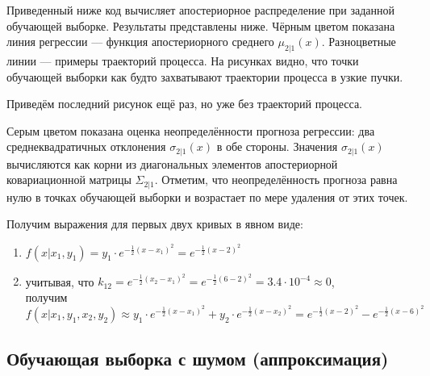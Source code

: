 \documentclass[11pt,a4paper]{article}
\providecommand{\tightlist}{%
      \setlength{\itemsep}{0pt}\setlength{\parskip}{0pt}}
\begin{document}
Приведенный ниже код вычисляет апостериорное распределение при заданной
обучающей выборке. Результаты представлены ниже. Чёрным цветом показана
линия регрессии --- функция апостериорного среднего \(\mu_{2|1}(x)\).
Разноцветные линии --- примеры траекторий процесса. На рисунках видно,
что точки обучающей выборки как будто захватывают траектории процесса в
узкие пучки.


    \begin{center}
    \end{center}
    
    Приведём последний рисунок ещё раз, но уже без траекторий процесса.

Серым цветом показана оценка неопределённости прогноза регрессии: два
среднеквадратичных отклонения \(\sigma_{2|1}(x)\) в обе стороны.
Значения \(\sigma_{2|1}(x)\) вычисляются как корни из диагональных
элементов апостериорной ковариационной матрицы \(\Sigma_{2|1}\).
Отметим, что неопределённость прогноза равна нулю в точках обучающей
выборки и возрастает по мере удаления от этих точек.


    \begin{center}
    \end{center}
    
    Получим выражения для первых двух кривых в явном виде:

\begin{enumerate}
\def\labelenumi{\arabic{enumi}.}
\tightlist
\item
  \(f(x | x_1, y_1) = y_1 \cdot e^{-\frac{1}{2}(x-x_1)^2} = e^{-\frac{1}{2}(x-2)^2}\)
\item
  учитывая, что
  \(k_{12} = e^{-\frac{1}{2}(x_2 - x_1)^2} = e^{-\frac{1}{2}(6 - 2)^2} = 3.4 \cdot 10^{-4} \approx 0\),\\
  получим
  \(f(x | x_1, y_1, x_2, y_2) \approx y_1 \cdot e^{-\frac{1}{2}(x-x_1)^2} + y_2 \cdot e^{-\frac{1}{2}(x-x_2)^2} = e^{-\frac{1}{2}(x-2)^2} - e^{-\frac{1}{2}(x-6)^2}\)
\end{enumerate}

    \hypertarget{ux43eux431ux443ux447ux430ux44eux449ux430ux44f-ux432ux44bux431ux43eux440ux43aux430-ux441-ux448ux443ux43cux43eux43c-ux430ux43fux43fux440ux43eux43aux441ux438ux43cux430ux446ux438ux44f}{%
\subsection{Обучающая выборка с шумом
(аппроксимация)}\label{ux43eux431ux443ux447ux430ux44eux449ux430ux44f-ux432ux44bux431ux43eux440ux43aux430-ux441-ux448ux443ux43cux43eux43c-ux430ux43fux43fux440ux43eux43aux441ux438ux43cux430ux446ux438ux44f}}
\end{document}
